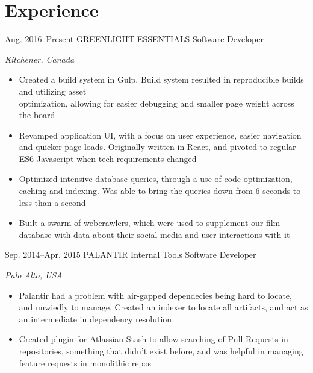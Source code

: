 \documentclass{friggeri-cv}
\begin{document}


\section{Experience}

\begin{sectionlist}
	\entry
	{Aug. 2016--Present}
	{GREENLIGHT ESSENTIALS}
	{Software Developer}
	{\emph {Kitchener, Canada}\\
		\begin{itemize}
		    \setlength{\itemsep}{0.2em}
			\item Created a build system in Gulp. Build system resulted in reproducible builds and utilizing asset \\optimization, allowing for easier debugging and smaller page weight across the board
			\item Revamped application UI, with a focus on user experience, easier navigation and quicker page loads. Originally written in React, and pivoted to regular ES6 Javascript when tech requirements changed
			\item Optimized intensive database queries, through a use of code optimization, caching and indexing. Was able to bring the queries down from 6 seconds to less than a second
			\item Built a swarm of webcrawlers, which were used to supplement our film database with data about their social media and user interactions with it
		\end{itemize}
	}
	
	\entry
	{Sep. 2014--Apr. 2015}
	{PALANTIR}
	{Internal Tools Software Developer}
	{\emph {Palo Alto, USA} \\
		\begin{itemize}
		    \setlength{\itemsep}{0.2em}
			\item Palantir had a problem with air-gapped dependecies being hard to locate, and unwiedly to manage. Created an indexer to locate all  artifacts, and act as an intermediate in dependency resolution
			\item Created plugin for Atlassian Stash to allow searching of Pull Requests in repositories, something that didn't exist before, and was helpful in managing feature requests in monolithic repos
		\end{itemize}
	}
	

\end{sectionlist}
\end{document}
